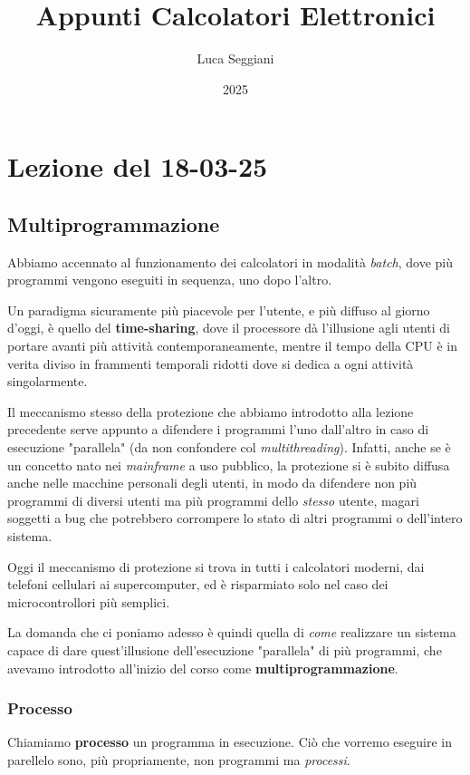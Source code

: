 \documentclass[a4paper,11pt]{article}
\title{Appunti Calcolatori Elettronici}
\author{Luca Seggiani}
\date{2025}
\begin{document}
\section{Lezione del 18-03-25}

\thispagestyle{empty}
\pagestyle{fancy}

\subsection{Multiprogrammazione}
Abbiamo accennato al funzionamento dei calcolatori in modalità \textit{batch}, dove più programmi vengono eseguiti in sequenza, uno dopo l'altro.

Un paradigma sicuramente più piacevole per l'utente, e più diffuso al giorno d'oggi, è quello del \textbf{time-sharing}, dove il processore dà l'illusione agli utenti di portare avanti più attività contemporaneamente, mentre il tempo della CPU è in verita diviso in frammenti temporali ridotti dove si dedica a ogni attività singolarmente.

Il meccanismo stesso della protezione che abbiamo introdotto alla lezione precedente serve appunto a difendere i programmi l'uno dall'altro in caso di esecuzione "parallela" (da non confondere col \textit{multithreading}).
Infatti, anche se è un concetto nato nei \textit{mainframe} a uso pubblico, la protezione si è subito diffusa anche nelle macchine personali degli utenti, in modo da difendere non più programmi di diversi utenti ma più programmi dello \textit{stesso} utente, magari soggetti a bug che potrebbero corrompere lo stato di altri programmi o dell'intero sistema.

Oggi il meccanismo di protezione si trova in tutti i calcolatori moderni, dai telefoni cellulari ai supercomputer, ed è risparmiato solo nel caso dei microcontrollori più semplici.

La domanda che ci poniamo adesso è quindi quella di \textit{come} realizzare un sistema capace di dare quest'illusione dell'esecuzione "parallela" di più programmi, che avevamo introdotto all'inizio del corso come \textbf{multiprogrammazione}.

\subsubsection{Processo}
Chiamiamo \textbf{processo} un programma in esecuzione. Ciò che vorremo eseguire in parellelo sono, più propriamente, non programmi ma \textit{processi}.
\end{document}

